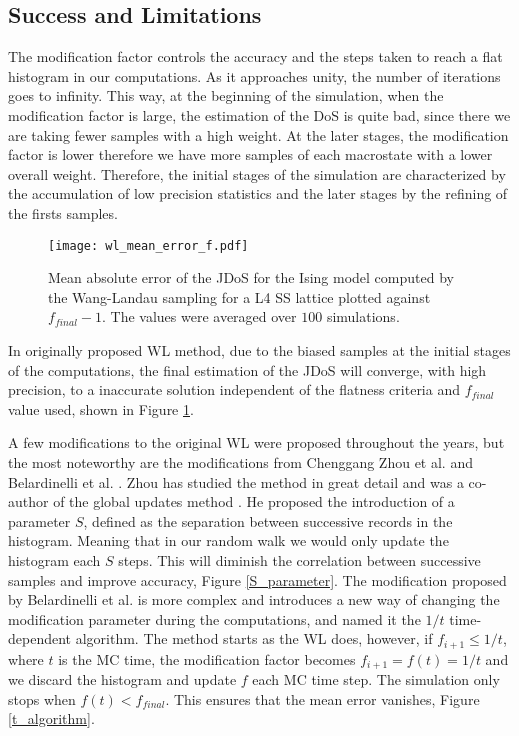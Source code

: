 \subsection{Success and Limitations}

	The modification factor controls the accuracy and the steps taken to reach a flat histogram in our computations. As it approaches unity, the number of iterations goes to infinity. This way, at the beginning of the simulation, when the modification factor is large, the estimation of the DoS is quite bad, since there we are taking fewer samples with a high weight. At the later stages, the modification factor is lower therefore we have more samples of each macrostate with a lower overall weight. 
Therefore, the initial stages of the simulation are characterized by the accumulation of low precision statistics and the later stages by the refining of the firsts samples. 



\begin{figure}[h]
	\centering
	\texttt{[image: wl\_mean\_error\_f.pdf]}
	\caption{Mean absolute error of the JDoS for the Ising model computed by the Wang-Landau sampling for a L4 SS lattice plotted against $f_{final}-1$. The values were averaged over $100$ simulations. }
	\label{error_abs_wl}
\end{figure}

	In originally proposed WL method, due to the biased samples at the initial stages of the computations, the final estimation of the JDoS will converge, with high precision, to a inaccurate solution independent of the flatness criteria and $f_{final}$ value used, shown in Figure \ref{error_abs_wl}. 

	A few modifications to the original WL were proposed throughout the years, but the most noteworthy  are the modifications from Chenggang Zhou et al. \cite{Zhou2005} and Belardinelli et al. \cite{Belardinelli2007}. Zhou has studied the method in great detail \cite{Zhou2005} and was a co-author of the global updates method \cite{WL_Cont}. He proposed the introduction of a parameter $S$, defined as the separation between successive records in the histogram. Meaning that in our random walk we would only update the histogram each $S$ steps. This will diminish the correlation between successive samples and improve accuracy, Figure \ref{S_parameter}.  
The modification proposed by Belardinelli et al. is more complex and introduces a new way of changing the modification parameter during the computations, and named it the $1/t$ time-dependent algorithm. The method starts as the WL does, however, if $f_{i+1} \leqslant 1/t$, where $t$ is the MC time, the modification factor becomes $f_{i+1} = f(t) = 1/t$ and we discard the histogram and update $f$ each MC time step. The simulation only stops when $f(t) < f_{final}$. This ensures that the mean error vanishes, Figure \ref{t_algorithm}.


